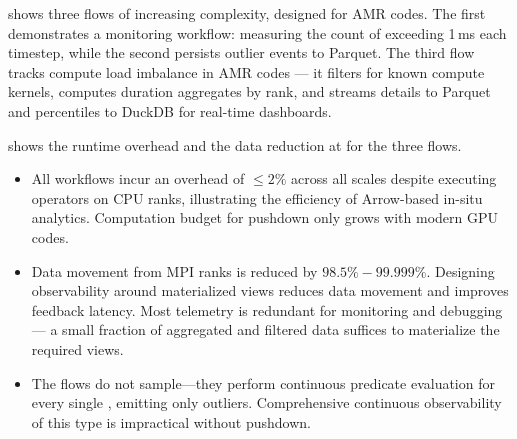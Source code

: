 
 shows three flows of increasing complexity, designed for AMR codes.
The first demonstrates a monitoring workflow: measuring the count of \mpiw{} exceeding 1\,ms each
timestep, while the second persists outlier events to Parquet.
The third flow tracks compute load imbalance in AMR codes --- it filters for known compute kernels,
computes duration aggregates by rank, and streams details to Parquet and percentiles to DuckDB for
real-time dashboards.


 shows the runtime overhead and the data reduction at \tiermpi{} for the three flows.
\begin{itemize}[leftmargin=*]
  \item
        All workflows incur an overhead of $\le 2\%$ across all scales despite executing
        operators on CPU ranks, illustrating the efficiency of Arrow-based in-situ analytics.
        Computation budget for pushdown only grows with modern GPU codes.
  \item Data movement from MPI ranks is reduced by $98.5\%-99.999\%$.
        Designing observability around materialized views reduces data movement and improves feedback
        latency.
        Most telemetry is redundant for monitoring and debugging --- a small fraction of aggregated and
        filtered data suffices to materialize the required views.
  \item The \mpiw{} flows do not sample---they perform continuous predicate evaluation for every
        single \mpiw{}, emitting only outliers.
        Comprehensive continuous observability of this type is impractical without pushdown.
\end{itemize}


